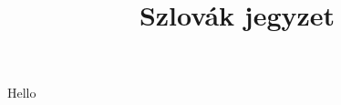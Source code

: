 \documentclass[10pt]{report}
\title{Szlovák jegyzet}
\date{}
\begin{document}
    Hello
\end{document}
